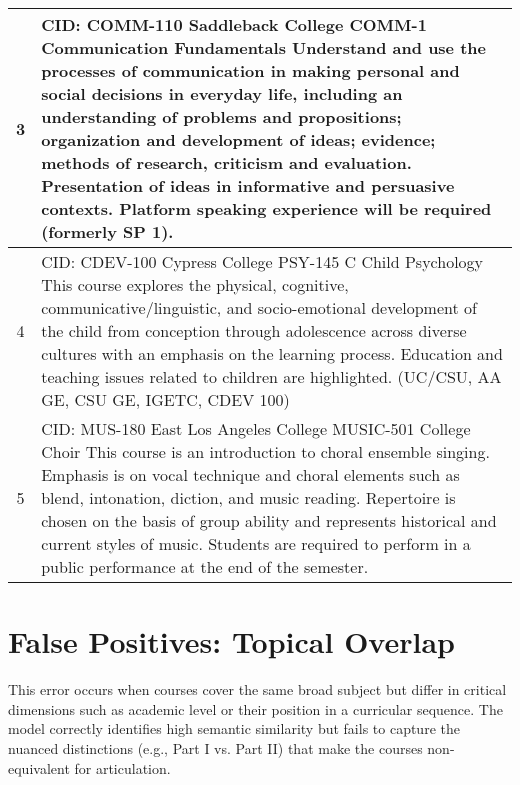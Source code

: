 \begin{longtable}{ >{\baselineskip=12pt}c >{\baselineskip=12pt}p{} }
\midrule
3 & CID: COMM-110 \newline
Saddleback College \newline
COMM-1 Communication Fundamentals \newline
Understand and use the processes of communication in making personal and social decisions in everyday life, including an understanding of problems and propositions; organization and development of ideas; evidence; methods of research, criticism and evaluation. Presentation of ideas in informative and persuasive contexts. Platform speaking experience will be required (formerly SP 1).\\
\midrule
4 & CID: CDEV-100 \newline
Cypress College \newline
PSY-145 C Child Psychology \newline
This course explores the physical, cognitive, communicative/linguistic, and socio-emotional development of the child from conception through adolescence across diverse cultures with an emphasis on the learning process. Education and teaching issues related to children are highlighted. (UC/CSU, AA GE, CSU GE, IGETC, CDEV 100)\\
\midrule
5 & CID: MUS-180 \newline
East Los Angeles College \newline
MUSIC-501 College Choir \newline
This course is an introduction to choral ensemble singing. Emphasis is on vocal technique and choral elements such as blend, intonation, diction, and music reading. Repertoire is chosen on the basis of group ability and represents historical and current styles of music. Students are required to perform in a public performance at the end of the semester.\\
\bottomrule
\end{longtable}

\section{False Positives: Topical Overlap}\label{app:topicoverlap}
This error occurs when courses cover the same broad subject but differ in critical dimensions such as academic level or their position in a curricular sequence. The model correctly identifies high semantic similarity but fails to capture the nuanced distinctions (e.g., Part I vs. Part II) that make the courses non-equivalent for articulation.

